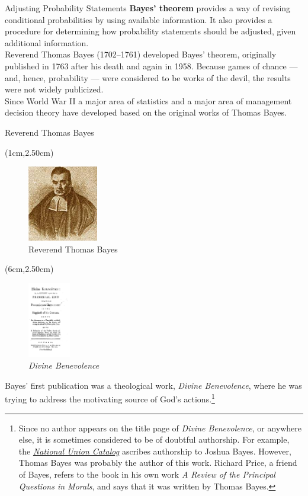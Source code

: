 \documentclass[pdf]{beamer}
\newcommand{\empr}[1]{{\color{franklinblue}\textbf{#1}}}
\theoremstyle{remark}
\theoremstyle{definition}
\begin{document}
\begin{frame}[t]{Adjusting Probability Statements}
\empr{Bayes' theorem} provides a way of revising conditional probabilities by using available information. It also provides a procedure for determining how probability statements should be adjusted, given additional information. \\
\vspace{1.5ex}
Reverend Thomas Bayes (1702–1761) developed Bayes’ theorem, originally published
in 1763 after his death and again in 1958. Because games of chance — and, hence, probability — were considered to be works of the devil, the results were not widely publicized. \\
\vspace{1.5ex}
Since World War II a major area of statistics and a major area of management decision theory have developed based on the original works of Thomas Bayes.
\end{frame}

\begin{frame}[t]{Reverend Thomas Bayes}
\begin{textblock*}{5cm}(1cm,2.50cm)
\begin{figure}[htbp]
  \includegraphics[height=1.3in]{Images/bayes.jpg}
  \caption{Reverend Thomas Bayes}
\end{figure}
\end{textblock*}
\begin{textblock*}{5cm}(6cm,2.50cm)
\begin{figure}[htbp]
  \includegraphics[height=1.3in]{Images/Bayes-DivineBenevolence.jpg}
  \caption{\textit{Divine Benevolence}}
\end{figure}
\end{textblock*}
\small
 Bayes' first publication was a theological work, \textit{Divine Benevolence}, where he was trying to address the motivating source of God's actions.\footnote{Since no author appears on the title page of \textit{Divine Benevolence}, or anywhere else, it is sometimes considered to be of doubtful authorship. For example, the \href{https://www.loc.gov/coll/nucmc/}{\textit{National Union Catalog}} ascribes authorship to Joshua Bayes. However, Thomas Bayes was probably the author of this work. Richard Price, a friend of Bayes,  refers to the book in his own work \textit{A Review of the Principal Questions in Morals}, and says that it was written by Thomas Bayes.} 
\end{frame}
\end{document}
